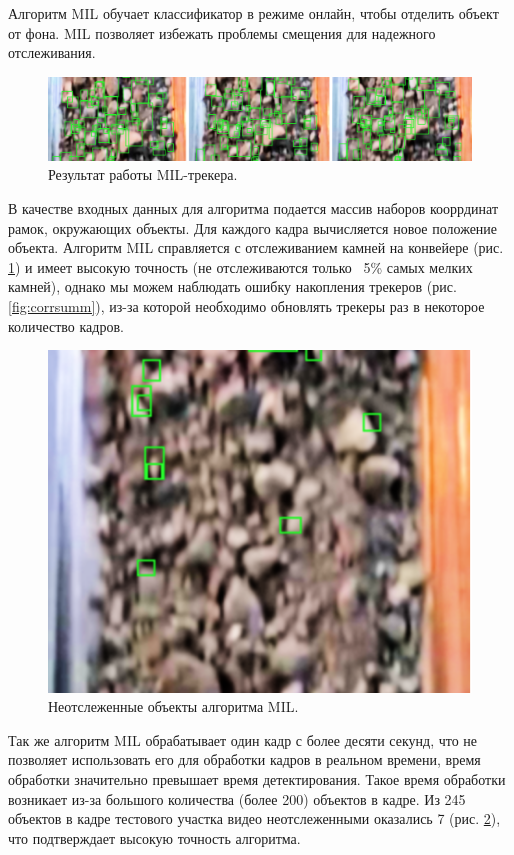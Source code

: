 \documentclass[times]{itmo-student-thesis}
\begin{document}
Алгоритм MIL обучает классификатор в режиме онлайн, чтобы отделить объект от фона. MIL позволяет избежать проблемы смещения для надежного отслеживания.

\begin{figure}
	\centering
	\includegraphics[width=\linewidth]{images/corr}
	\caption{Результат работы MIL-трекера.}
	\label{fig:corr}
\end{figure}

В качестве входных данных для алгоритма подается массив наборов кооррдинат рамок, окружающих объекты. Для каждого кадра вычисляется новое положение объекта. Алгоритм MIL справляется с отслеживанием камней на конвейере (рис. \ref{fig:corr}) и имеет высокую точность (не отслеживаются только ~5\% самых мелких камней), однако мы можем наблюдать ошибку накопления трекеров (рис. \ref{fig:corrsumm}), из-за которой необходимо обновлять трекеры раз в некоторое количество кадров.  


\begin{figure}[h!]
	\centering
	\includegraphics[width=0.5\linewidth]{images/mil_donttrack}
	\caption{Неотслеженные объекты алгоритма MIL.}
	\label{fig:mildonttrack}
\end{figure}


Так же алгоритм MIL обрабатывает один кадр с более десяти секунд, что не позволяет использовать его для обработки кадров в реальном времени, время обработки значительно превышает время детектирования.  Такое время обработки возникает из-за большого количества (более 200) объектов в кадре. 
Из 245 объектов в кадре тестового участка видео неотслеженными оказались 7 (рис. \ref{fig:mildonttrack}), что подтверждает высокую точность алгоритма. 
\end{document}
